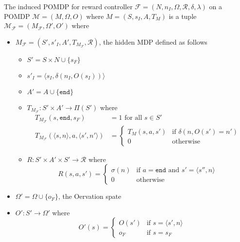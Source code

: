 

\begin{definition}
	\label{def:reward-mdp}
	The induced POMDP for reward controller $\mathcal{F}=(N, n_I, \Omega, \mathcal{R}, \delta, \lambda)$ on a POMDP $\mathcal{M}=(M,\Omega,O)$ where $M=(S,s_I,A,T_{M})$ is a tuple $\mathcal{M_\mathcal{F}}=(M_\mathcal{F},\Omega',O')$ where 
	\begin{itemize}
		\item $M_\mathcal{F} = (S',s'_I,A',T_{M_\mathcal{F}},\mathcal{R})$, the hidden MDP defined as follows
		\begin{itemize}
			\item $S'=S\times N \cup \{s_F\}$
			\item $s'_I = \langle s_I, \delta(n_I, O(s_I))\rangle$
			\item $A'=A\cup \{\texttt{end}\}$
			\item $T_{M_\mathcal{F}}:S'\times A' \to \Pi(S')$ where
				\begin{align*}				
					T_{M_\mathcal{F}}(s,\texttt{end},s_F) &= 1 \text{ for all } s\in S'\\
					T_{M_\mathcal{F}}(\langle s,n\rangle,a,\langle s',n'\rangle) &= \begin{cases}
						T_M(s,a,s') & \text{if } \delta(n,O(s')=n') \\
						0 & \text{otherwise}
					\end{cases}
				\end{align*}
			\item $R:S'\times A'\times S' \to \mathcal{R}$ where 
                \begin{equation*}
					R(s,a,s') = \begin{cases}
					\sigma(n) & \text{if } a=\texttt{end} \text{ and } s'=\langle s'',n\rangle \\
					0 & \text{otherwise} 
					\end{cases}
				\end{equation*}
		\end{itemize}
		\item $\Omega'=\Omega \cup \{o_F\}$, the Oervation spate
		\item $O':S'\to \Omega'$ where 
			\begin{equation*}
				O'(s)= \begin{cases}
				O(s') & \text{if } s=\langle s',n\rangle\\
				o_F & \text{if } s=s_F
				\end{cases}
			\end{equation*}
		\end{itemize}
\end{definition}


